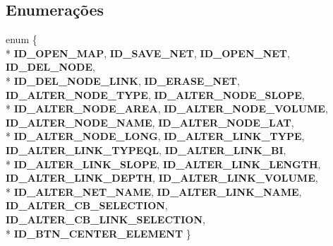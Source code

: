 \subsection*{Enumerações}
\begin{DoxyCompactItemize}
\item 
enum \{ \\*
{\bf I\+D\+\_\+\+O\+P\+E\+N\+\_\+\+M\+AP}, 
{\bf I\+D\+\_\+\+S\+A\+V\+E\+\_\+\+N\+ET}, 
{\bf I\+D\+\_\+\+O\+P\+E\+N\+\_\+\+N\+ET}, 
{\bf I\+D\+\_\+\+D\+E\+L\+\_\+\+N\+O\+DE}, 
\\*
{\bf I\+D\+\_\+\+D\+E\+L\+\_\+\+N\+O\+D\+E\+\_\+\+L\+I\+NK}, 
{\bf I\+D\+\_\+\+E\+R\+A\+S\+E\+\_\+\+N\+ET}, 
{\bf I\+D\+\_\+\+A\+L\+T\+E\+R\+\_\+\+N\+O\+D\+E\+\_\+\+T\+Y\+PE}, 
{\bf I\+D\+\_\+\+A\+L\+T\+E\+R\+\_\+\+N\+O\+D\+E\+\_\+\+S\+L\+O\+PE}, 
\\*
{\bf I\+D\+\_\+\+A\+L\+T\+E\+R\+\_\+\+N\+O\+D\+E\+\_\+\+A\+R\+EA}, 
{\bf I\+D\+\_\+\+A\+L\+T\+E\+R\+\_\+\+N\+O\+D\+E\+\_\+\+V\+O\+L\+U\+ME}, 
{\bf I\+D\+\_\+\+A\+L\+T\+E\+R\+\_\+\+N\+O\+D\+E\+\_\+\+N\+A\+ME}, 
{\bf I\+D\+\_\+\+A\+L\+T\+E\+R\+\_\+\+N\+O\+D\+E\+\_\+\+L\+AT}, 
\\*
{\bf I\+D\+\_\+\+A\+L\+T\+E\+R\+\_\+\+N\+O\+D\+E\+\_\+\+L\+O\+NG}, 
{\bf I\+D\+\_\+\+A\+L\+T\+E\+R\+\_\+\+L\+I\+N\+K\+\_\+\+T\+Y\+PE}, 
{\bf I\+D\+\_\+\+A\+L\+T\+E\+R\+\_\+\+L\+I\+N\+K\+\_\+\+T\+Y\+P\+E\+QL}, 
{\bf I\+D\+\_\+\+A\+L\+T\+E\+R\+\_\+\+L\+I\+N\+K\+\_\+\+BI}, 
\\*
{\bf I\+D\+\_\+\+A\+L\+T\+E\+R\+\_\+\+L\+I\+N\+K\+\_\+\+S\+L\+O\+PE}, 
{\bf I\+D\+\_\+\+A\+L\+T\+E\+R\+\_\+\+L\+I\+N\+K\+\_\+\+L\+E\+N\+G\+TH}, 
{\bf I\+D\+\_\+\+A\+L\+T\+E\+R\+\_\+\+L\+I\+N\+K\+\_\+\+D\+E\+P\+TH}, 
{\bf I\+D\+\_\+\+A\+L\+T\+E\+R\+\_\+\+L\+I\+N\+K\+\_\+\+V\+O\+L\+U\+ME}, 
\\*
{\bf I\+D\+\_\+\+A\+L\+T\+E\+R\+\_\+\+N\+E\+T\+\_\+\+N\+A\+ME}, 
{\bf I\+D\+\_\+\+A\+L\+T\+E\+R\+\_\+\+L\+I\+N\+K\+\_\+\+N\+A\+ME}, 
{\bf I\+D\+\_\+\+A\+L\+T\+E\+R\+\_\+\+C\+B\+\_\+\+S\+E\+L\+E\+C\+T\+I\+ON}, 
{\bf I\+D\+\_\+\+A\+L\+T\+E\+R\+\_\+\+C\+B\+\_\+\+L\+I\+N\+K\+\_\+\+S\+E\+L\+E\+C\+T\+I\+ON}, 
\\*
{\bf I\+D\+\_\+\+B\+T\+N\+\_\+\+C\+E\+N\+T\+E\+R\+\_\+\+E\+L\+E\+M\+E\+NT}
 \}
\end{DoxyCompactItemize}
